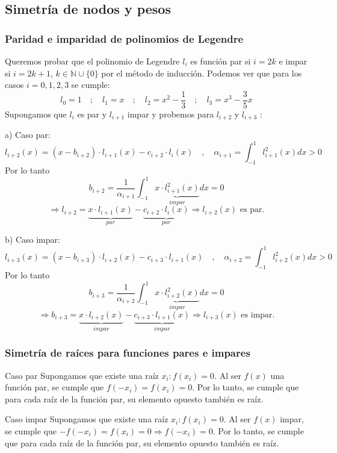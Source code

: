 \documentclass{beamer}
\begin{document}
\subsection{Simetría de nodos y pesos}
\begin{frame}
\frametitle{Paridad e imparidad de polinomios de Legendre}
Queremos probar que el polinomio de Legendre $l_i$ es función par si $i=2k$ e impar si $i=2k+1$, $k\in\mathbb{N}\cup\{0\}$ por el método de inducción. Podemos ver que para los casos $i=0, 1, 2, 3$ se cumple:
\[l_0=1\quad;\quad l_1=x\quad;\quad l_2=x^2-\frac{1}{3}\quad;\quad l_3=x^3-\frac{3}{5}x \]
Supongamos que $l_i$ es par y $l_{i+1}$ impar y probemos para $l_{i+2}$ y $l_{i+3}$ :
\end{frame}
\begin{frame}
a) Caso par:
\[l_{i+2}(x)=(x-b_{i+2})\cdot l_{i+1}(x)-c_{i+2}\cdot l_i(x)\quad, \quad\alpha_{i+1}=\int_{-1}^1l_{i+1}^2(x)dx>0\]
Por lo tanto \[b_{i+2}=\frac{1}{\alpha_{i+1}} \int_{-1}^1\underbrace{x\cdot l_{i+1}^2(x)}_{impar}dx=0\]
\[\Rightarrow l_{i+2}=\underbrace{x\cdot l_{i+1}(x)}_{par}-\underbrace{c_{i+2}\cdot l_i(x)}_{par}\Rightarrow l_{i+2}(x)\text{ es par.} \]
\end{frame}
\begin{frame}
b) Caso impar:
\[l_{i+3}(x)=(x-b_{i+3})\cdot l_{i+2}(x)-c_{i+3}\cdot l_{i+1}(x)\quad,\quad\alpha_{i+2}=\int_{-1}^1l_{i+2}^2(x)dx>0\] 
Por lo tanto \[b_{i+3}=\frac{1}{\alpha_{i+2}}\int_{-1}^1\underbrace{x\cdot l_{i+2}^2(x)}_{impar}dx=0\]
\[\Rightarrow b_{i+3}=\underbrace{x\cdot l_{i+2}(x)}_{impar}-\underbrace{c_{i+3}\cdot l_{i+1}(x)}_{impar}\Rightarrow l_{i+3}(x)\text{ es impar.}\]
\end{frame}

\begin{frame} 
\frametitle{Simetría de raíces para funciones pares e impares}
\begin{block}{Caso par} 
Supongamos que existe una raíz $x_i:f(x_i)=0$. Al ser $f(x)$ una función par, se cumple que $f(-x_i)=f(x_i)=0$. Por lo tanto, se cumple que para cada raíz de la función par, su elemento opuesto también es raíz.
\end{block}
\begin{block}{Caso impar} 
Supongamos que existe una raíz $x_i:f(x_i)=0$. Al ser $f(x)$ impar, se cumple que $-f(-x_i)=f(x_i)=0\Rightarrow f(-x_i)=0$. Por lo tanto, se cumple que para cada raíz de la función par, su elemento opuesto también es raíz.
\end{block}
\end{frame}
\end{document}

